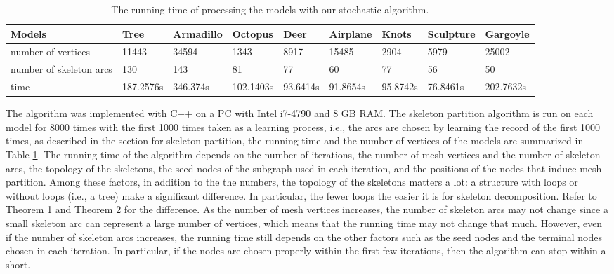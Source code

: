 \begin{table}[htb]

\begin{footnotesize}

\begin{center}

    \begin{tabular}{p{3.0cm} p{1.45cm} p{1.3cm} p{1.3cm} p{1.3cm} p{1.35cm} p{1.5cm} p{1.5cm}p{1.5cm}}

    \hline

     Models& Tree& Armadillo& Octopus& Deer& Airplane& Knots &Sculpture & Gargoyle\\ \hline
     number of vertices & 11443   & 34594   & 1343    & 8917  & 15485 & 2904    & 5979    &25002 \\ \hline
     number of skeleton arcs    &130 & 143 & 81 &77 &60 & 77 &56  &50 \\ \hline
     time    &187.2576s & 346.374s & 102.1403s &93.6414s &91.8654s & 95.8742s &76.8461s  &202.7632s \\
  \hline

    \end{tabular}

\end{center}

\end{footnotesize}

\caption{The running time of processing the models with our stochastic algorithm.}\label{tab:ertms:time}

\end{table}






The algorithm was implemented with C++ on a PC with Intel i7-4790 and 8 GB RAM. {\color{blue}The skeleton partition algorithm is run on each model for 8000 times with the first 1000 times taken as a learning process, i.e., the arcs are chosen by learning the record of the first 1000 times, as described in the section for skeleton partition,} the running time and the number of vertices of the models are summarized in Table \ref{tab:ertms:time}. {\color{blue} The running time of the algorithm depends on the number of iterations, the number of mesh vertices and the number of skeleton arcs, the topology of the skeletons, the seed nodes of the subgraph used in each iteration, and the positions of the nodes that induce mesh partition. Among these factors, in addition to the the numbers, the topology of the skeletons matters a lot: a structure with loops or without loops (i.e., a tree) make a significant difference. In particular, the fewer loops the easier it is for skeleton decomposition. Refer to Theorem 1 and Theorem 2 for the difference. As the number of mesh vertices increases, the number of skeleton arcs may not change since a small skeleton arc can represent a large number of vertices, which means that the running time may not change that much. However, even if the number of skeleton arcs increases, the running time still depends on the other factors such as the seed nodes and the terminal nodes chosen in each iteration. In particular, if the nodes are chosen properly within the first few iterations, then the algorithm can stop within a short.}

